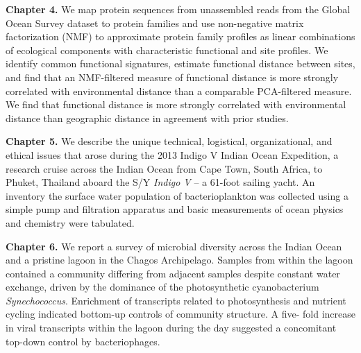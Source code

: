 

\noindent\textbf{Chapter 4.} We map protein sequences from unassembled reads from the Global Ocean Survey
dataset to protein families and use non-negative matrix factorization (NMF) to
approximate protein family profiles as linear combinations of ecological
components with characteristic functional and site profiles. We identify
common functional signatures, estimate functional distance between sites, and
find that an NMF-filtered measure of functional distance is more strongly
correlated with environmental distance than a comparable PCA-filtered measure.
We find that functional distance is more strongly correlated with
environmental distance than geographic distance in agreement with prior
studies.


\noindent\textbf{Chapter 5.} We describe the unique technical,
logistical, organizational, and ethical issues that arose during the 2013
Indigo V Indian Ocean Expedition, a research cruise across the Indian Ocean
from Cape Town, South Africa, to Phuket, Thailand aboard the S/Y {\em Indigo
V} -- a 61-foot sailing yacht. An inventory the surface water population of
bacterioplankton was collected using a simple pump and filtration apparatus
and basic measurements of ocean physics and chemistry were
tabulated.

\noindent\textbf{Chapter 6.} We report a survey of microbial diversity across the Indian Ocean and a
pristine lagoon in the Chagos Archipelago. Samples from within the lagoon
contained a community differing from adjacent samples despite constant water
exchange, driven by the dominance of the photosynthetic cyanobacterium {\em
Synechococcus}. Enrichment of transcripts related to photosynthesis and
nutrient cycling indicated bottom-up controls of community structure. A five-
fold increase in viral transcripts within the lagoon during the day suggested
a concomitant top-down control by bacteriophages.

